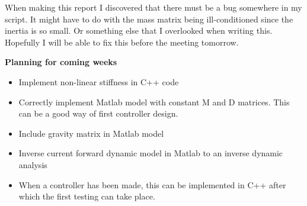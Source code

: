 When making this report I discovered that there must be a bug somewhere in my script. It might have to do with the mass matrix being ill-conditioned since the inertia is so small. Or something else that I overlooked when writing this. Hopefully I will be able to fix this before the meeting tomorrow.












\textbf{Planning for coming weeks}


\begin{itemize}
    \item Implement non-linear stiffness in C++ code
    \item Correctly implement Matlab model with constant M and D matrices. This can be a good way of first controller design.
    \item Include gravity matrix in Matlab model
    \item Inverse current forward dynamic model in Matlab to an inverse dynamic analysis
    \item When a controller has been made, this can be implemented in C++ after which the first testing can take place.
\end{itemize}
